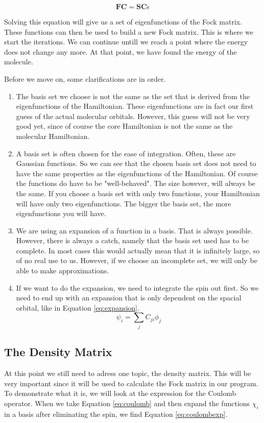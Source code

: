 \begin{equation}\label{eq:Roothaan-Hall}
    \boldsymbol{FC} = \boldsymbol{SC}\epsilon
\end{equation}

Solving this equation will give us a set of eigenfunctions of the Fock matrix. 
These functions can then be used to build a new Fock matrix. This is where we 
start the iterations. We can continue untill we reach a point where the energy 
does not change any more. At that point, we have found the energy of the molecule.

Before we move on, some clarifications are in order. 
\begin{enumerate}
    \item The basis set we choose is not the same as the set that is derived
    from the eigenfunctions of the Hamiltonian. These eigenfunctions are in fact
    our first guess of the actual molecular orbitals. However, this guess will not be
    very good yet, since of course the core Hamiltonian is not the same as the 
    molecular Hamiltonian. 
    \item A basis set is often chosen for the ease of integration. Often, these
    are Gaussian functions. So we can see that the chosen basis set does not
    need to have the same properties as the eigenfunctions of the Hamiltonian. 
    Of course the functions do have to be "well-behaved". The size however, will always be the same.
    If you choose a basis set with only two functions, your Hamiltonian will have only
    two eigenfunctions. The bigger the basis set, the more eigenfunctions you will have. 
    \item We are using an expansion of a function in a basis. That is always possible.
    However, there is always a catch, namely that the basis set used has to be complete.
    In most cases this would actually mean that it is infinitely large, so of no
    real use to us. However, if we choose an incomplete set, we will only be able
    to make approximations.
    \item If we want to do the expansion, we need to integrate the spin out first.
    So we need to end up with an expansion that is only dependent on the spacial
    orbital, like in Equation \ref{eq:expansion}.
    \begin{equation}\label{eq:expansion}
        \psi_i = \sum_jC_{ji}\phi_j
    \end{equation}
\end{enumerate}

\subsection{The Density Matrix}
\label{subsec:theDM}
At this point we still need to adress one topic, the density matrix. This will be
very important since it will be used to calculate the Fock matrix in our program.
To demonstrate what it is, we will look at the expression for the Coulomb operator.
When we take Equation \ref{eq:coulomb} and then expand the functions $\chi_i$ in
a basis after eliminating the spin, we find Equation \ref{eq:coulombexp}.


